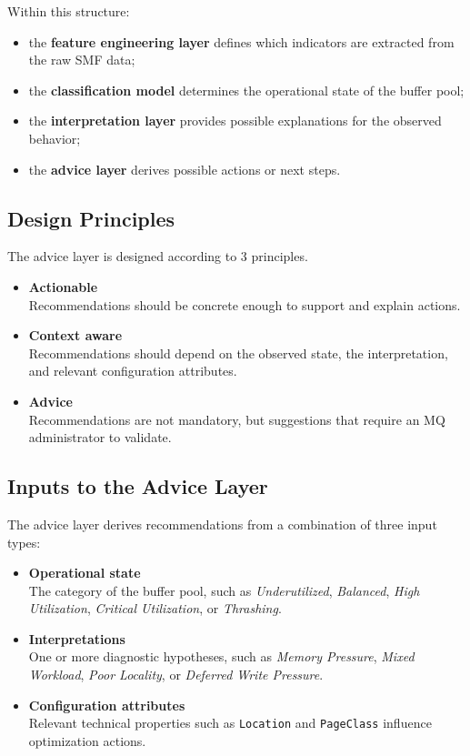 Within this structure:
\begin{itemize}
    \item the \textbf{feature engineering layer} defines which indicators are extracted from the raw SMF data;
    \item the \textbf{classification model} determines the operational state of the buffer pool;
    \item the \textbf{interpretation layer} provides possible explanations for the observed behavior;
    \item the \textbf{advice layer} derives possible actions or next steps.
\end{itemize}

\subsection{Design Principles}

The advice layer is designed according to 3 principles. 

\begin{itemize}
    \item \textbf{Actionable} \\
    Recommendations should be concrete enough to support and explain actions.
    
    \item \textbf{Context aware} \\
    Recommendations should depend on the observed state, the interpretation, and relevant configuration attributes.
    
    \item \textbf{Advice} \\
    Recommendations are not mandatory, but suggestions that require an MQ administrator to validate.
\end{itemize}

\subsection{Inputs to the Advice Layer}

The advice layer derives recommendations from a combination of three input types:

\begin{itemize}
    \item \textbf{Operational state} \\
    The category of the buffer pool, such as \textit{Underutilized}, \textit{Balanced}, \textit{High Utilization}, \textit{Critical Utilization}, or \textit{Thrashing}.
    
    \item \textbf{Interpretations} \\
    One or more diagnostic hypotheses, such as \textit{Memory Pressure}, \textit{Mixed Workload}, \textit{Poor Locality}, or \textit{Deferred Write Pressure}.
    
    \item \textbf{Configuration attributes} \\
    Relevant technical properties such as \texttt{Location} and \texttt{PageClass} influence optimization actions.
\end{itemize}

